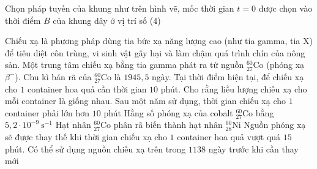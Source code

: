 \begin{ex}
		{\True Chọn pháp tuyến của khung như trên hình vẽ, mốc thời gian $t=0$ được chọn vào thời điểm $B$ của khung dây ở vị trí số (4)}
	\end{ex}

	\begin{ex}%
		Chiếu xạ là phương pháp dùng tia bức xạ năng lượng cao (như tia gamma, tia X) để tiêu diệt côn trùng, vi sinh vật gây hại và làm chậm quá trình chín của nông sản. Một trung tâm chiếu xạ bằng tia gamma phát ra từ nguồn ${}^{60}_{27}\text{Co}$ (phóng xạ $\beta^-$). Chu kì bán rã của ${}^{60}_{27}\text{Co}$ là $1945{,}5$ ngày. Tại thời điểm hiện tại, để chiếu xạ cho $1$ container hoa quả cần thời gian $10$ phút. Cho rằng liều lượng chiếu xạ cho mỗi container là giống nhau.
		\choiceTFt
		{\True Sau một năm sử dụng, thời gian chiếu xạ cho $1$ container phải lớn hơn $10$ phút}
		{Hằng số phóng xạ của cobalt ${}^{60}_{27}\text{Co}$ bằng $5{,}2\cdot 10^{-9}~\text{s}^{-1}$}
		{\True Hạt nhân ${}^{60}_{27}\text{Co}$ phân rã biến thành hạt nhân ${}^{60}_{28}\text{Ni}$}
		{\True Nguồn phóng xạ sẽ được thay thế khi thời gian chiếu xạ cho $1$ container hoa quả vượt quá $15$ phút. Có thể sử dụng nguồn chiếu xạ trên trong $1138$ ngày trước khi cần thay mới}
	\end{ex}

